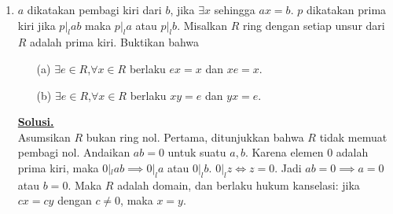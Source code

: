 \documentclass[12pt,twoside]{article}
\newenvironment{solution}
{
	\par\noindent\textbf{\underline{Solusi.}}\\
}
{
	\par
}
\begin{document}
\begin{enumerate}
\begin{solution}
\begin{enumerate}
                  Hubungan ini menunjukkan bahwa himpunan $\{y_j\}$ adalah basis dual bagi $\{x_i\}$.
                  Jika $K = \text{span}\{x_1, \dots, x_k\}$, maka untuk setiap $j \in \{k+1, \dots, n\}$ dan $i \in \{1, \dots, k\}$, kita punya $\langle x_i, y_j \rangle = \delta_{ij} = 0$.
                  Artinya, setiap vektor $y_{k+1}, \dots, y_n$ tegak lurus terhadap seluruh vektor basis $K$, sehingga tegak lurus terhadap $K$.
                  Jadi $\text{span}\{y_{k+1}, \dots, y_n\} \subseteq K^\perp$.
                  Karena dimensi $K^\perp = n-k$ dan vektor $y_{k+1}, \dots, y_n$ bebas linier (bagian dari basis), maka mereka membentuk basis untuk $K^\perp$.

            \item[(b)] Jika $X$ tidak ortonormal, misalkan $G$ adalah matriks Gram dari $X$ dengan $G_{pq} = \langle e_p, e_q \rangle$.
                  Perhitungan hasil kali dalam menjadi:
                  $$ \langle x_i, y_j \rangle = \sum_{p,q} A_{pi} \overline{B_{qj}} G_{pq} = \sum_{p,q} \overline{B_{qj}} G_{pq} A_{pi}. $$
                  Ini adalah elemen ke-$(j,i)$ dari matriks $B^* G A$.
                  Karena $B^* = A^{-1}$, maka nilainya adalah elemen matriks $A^{-1} G A$.
                  Secara umum $A^{-1} G A \neq I$ kecuali $G = I$ (ortonormal) atau $A$ memiliki sifat khusus yang mengkomutkan $G$.
                  Karena matriks hasil kali dalam tidak identitas, maka $\langle x_i, y_j \rangle \neq \delta_{ij}$.
                  Akibatnya, $y_{k+1}, \dots, y_n$ belum tentu ortogonal terhadap $x_1, \dots, x_k$.
                  Jadi, implikasi tersebut tidak berlaku jika $X$ bukan basis ortonormal.
          \end{enumerate}
        \end{solution}

  \item $a$ dikatakan pembagi kiri dari $b$, jika $\exists x$ sehingga $ax=b$. $p$ dikatakan prima kiri jika $p|_lab$ maka $p|_la$ atau $p|_lb$. Misalkan $R$ ring dengan setiap unsur dari $R$ adalah prima kiri. Buktikan bahwa
        \begin{enumerate}
          \item [(a)] $\exists e\in R$,$\forall x\in R$ berlaku $ex=x$ dan $xe=x$.
          \item[(b)] $\exists e\in R$,$\forall x\in R$ berlaku $xy=e$ dan $yx=e$.
        \end{enumerate}
        \begin{solution}
          Asumsikan $R$ bukan ring nol.
          Pertama, ditunjukkan bahwa $R$ tidak memuat pembagi nol.
          Andaikan $ab=0$ untuk suatu $a,b$. Karena elemen $0$ adalah prima kiri, maka $0 |_l ab \implies 0 |_l a$ atau $0 |_l b$.
          $0 |_l z \iff z=0$. Jadi $ab=0 \implies a=0$ atau $b=0$.
          Maka $R$ adalah domain, dan berlaku hukum kanselasi: jika $cx=cy$ dengan $c \ne 0$, maka $x=y$.


\end{solution}
\end{enumerate}
\end{document}

